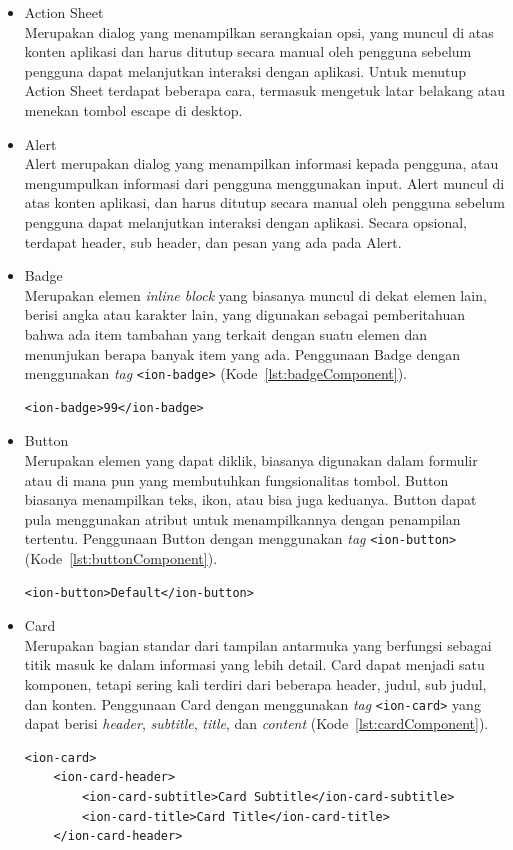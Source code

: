 \begin{itemize}
	\item Action Sheet \\
	Merupakan dialog yang menampilkan serangkaian opsi, yang muncul di atas konten aplikasi dan harus ditutup secara manual oleh pengguna sebelum pengguna dapat melanjutkan interaksi dengan aplikasi. Untuk menutup Action Sheet terdapat beberapa cara, termasuk mengetuk latar belakang atau menekan tombol escape di desktop.

	\item Alert \\
	Alert merupakan dialog yang menampilkan informasi kepada pengguna, atau mengumpulkan informasi dari pengguna menggunakan input. Alert muncul di atas konten aplikasi, dan harus ditutup secara manual oleh pengguna sebelum pengguna dapat melanjutkan interaksi dengan aplikasi. Secara opsional, terdapat header, sub header, dan pesan yang ada pada Alert.
	\item Badge \\
	Merupakan elemen {\it inline block} yang biasanya muncul di dekat elemen lain, berisi angka atau karakter lain, yang digunakan sebagai pemberitahuan bahwa ada item tambahan yang terkait dengan suatu elemen dan menunjukan berapa banyak item yang ada. Penggunaan Badge dengan menggunakan {\it tag} \texttt{<ion-badge>} (Kode~\ref{lst:badgeComponent}).
\begin{lstlisting}[label={lst:badgeComponent}, caption=Potongan Kode Program dari Badge Component]
<ion-badge>99</ion-badge>
\end{lstlisting} 
	\item Button \\
	Merupakan elemen yang dapat diklik, biasanya digunakan dalam formulir atau di mana pun yang membutuhkan fungsionalitas tombol. Button biasanya menampilkan teks, ikon, atau bisa juga keduanya. Button dapat pula menggunakan atribut untuk menampilkannya dengan penampilan tertentu. Penggunaan Button dengan menggunakan {\it tag} \texttt{<ion-button>} (Kode~\ref{lst:buttonComponent}). 
\begin{lstlisting}[label={lst:buttonComponent}, caption=Potongan Kode Program dari Button Component]
<ion-button>Default</ion-button>
\end{lstlisting} 

	\item Card \\
	Merupakan bagian standar dari tampilan antarmuka yang berfungsi sebagai titik masuk ke dalam informasi yang lebih detail. Card dapat menjadi satu komponen, tetapi sering kali terdiri dari beberapa header, judul, sub judul, dan konten. Penggunaan Card dengan menggunakan {\it tag} \texttt{<ion-card>} yang dapat berisi {\it header}, {\it subtitle}, {\it title}, dan {\it content} (Kode~\ref{lst:cardComponent}).
	\newpage
\begin{lstlisting}[label={lst:cardComponent}, caption=Potongan Kode Program dari Card Component]
<ion-card>
	<ion-card-header>
		<ion-card-subtitle>Card Subtitle</ion-card-subtitle>
		<ion-card-title>Card Title</ion-card-title>
	</ion-card-header>
				

\end{lstlisting}
\end{itemize}
